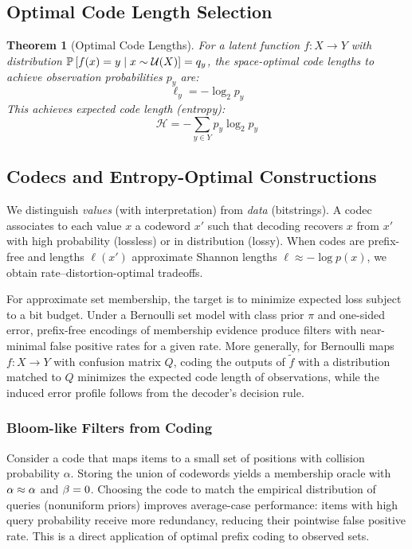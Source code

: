 \documentclass[11pt,final,hidelinks]{article}
\newtheorem{theorem}{Theorem}[section]
\begin{document}
\subsection{Optimal Code Length Selection}

\begin{theorem}[Optimal Code Lengths]
For a latent function $f: X \to Y$ with distribution $\mathbb{P}\left[f(x) = y \mid x \sim \mathcal{U}(X)\right] = q_y$, the space-optimal code lengths to achieve observation probabilities $p_y$ are:
\begin{equation}
\ell_y = -\log_2 p_y
\end{equation}
This achieves expected code length (entropy):
\begin{equation}
\mathcal{H} = -\sum_{y \in Y} p_y \log_2 p_y
\end{equation}
\end{theorem}

\subsection{Codecs and Entropy-Optimal Constructions}

We distinguish \emph{values} (with interpretation) from \emph{data} (bitstrings). A codec associates to each value $x$ a codeword $x'$ such that decoding recovers $x$ from $x'$ with high probability (lossless) or in distribution (lossy). When codes are prefix-free and lengths $\ell(x')$ approximate Shannon lengths $\ell\approx -\log p(x)$, we obtain rate–distortion-optimal tradeoffs.

For approximate set membership, the target is to minimize expected loss subject to a bit budget. Under a Bernoulli set model with class prior $\pi$ and one-sided error, prefix-free encodings of membership evidence produce filters with near-minimal false positive rates for a given rate. More generally, for Bernoulli maps $f:X\to Y$ with confusion matrix $Q$, coding the outputs of $\tilde{f}$ with a distribution matched to $Q$ minimizes the expected code length of observations, while the induced error profile follows from the decoder's decision rule.

\subsubsection{Bloom-like Filters from Coding}
Consider a code that maps items to a small set of positions with collision probability $\alpha$. Storing the union of codewords yields a membership oracle with $\alpha\approx\alpha$ and $\beta=0$. Choosing the code to match the empirical distribution of queries (nonuniform priors) improves average-case performance: items with high query probability receive more redundancy, reducing their pointwise false positive rate. This is a direct application of optimal prefix coding to observed sets.
\end{document}
